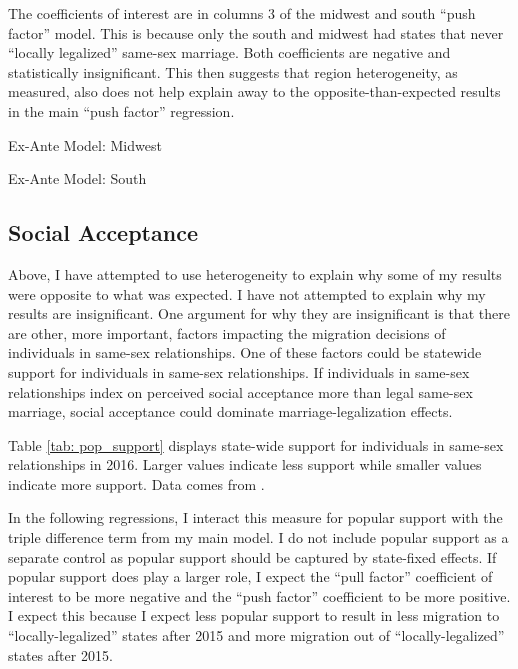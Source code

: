 \documentclass[12pt,letterpaper]{article}
\begin{document}
The coefficients of interest are in columns 3 of the midwest and south “push factor” model. This is because only the south and midwest had states that never “locally legalized” same-sex marriage. Both coefficients are negative and statistically insignificant. This then suggests that region heterogeneity, as measured, also does not help explain away to the opposite-than-expected results in the main “push factor” regression. 

\clearpage
\begin{table}[p] %
    \centering
    \caption{Ex-Ante Model: Midwest}
    \label{tab: midwest_exante_model}
    
\end{table}
\begin{table}[p]
    \centering
    \caption{Ex-Ante Model: South}
    \label{tab: south_exante_model}
    
\end{table}



\clearpage
\subsection{Social Acceptance}

Above, I have attempted to use heterogeneity to explain why some of my results were opposite to what was expected. I have not attempted to explain why my results are insignificant. One argument for why they are insignificant is that there are other, more important, factors impacting the migration decisions of individuals in same-sex relationships. One of these factors could be statewide support for individuals in same-sex relationships. If individuals in same-sex relationships index on perceived social acceptance more than legal same-sex marriage, social acceptance could dominate marriage-legalization effects.

Table \ref{tab: pop_support} displays state-wide support for individuals in same-sex relationships in 2016. Larger values indicate less support while smaller values indicate more support. Data comes from \citet{29}.



In the following regressions, I interact this measure for popular support with the triple difference term from my main model. I do not include popular support as a separate control as popular support should be captured by state-fixed effects. If popular support does play a larger role, I expect the “pull factor” coefficient of interest to be more negative and the “push factor” coefficient to be more positive. I expect this because I expect less popular support to result in less migration to “locally-legalized” states after 2015 and more migration out of “locally-legalized” states after 2015. 
\end{document}
